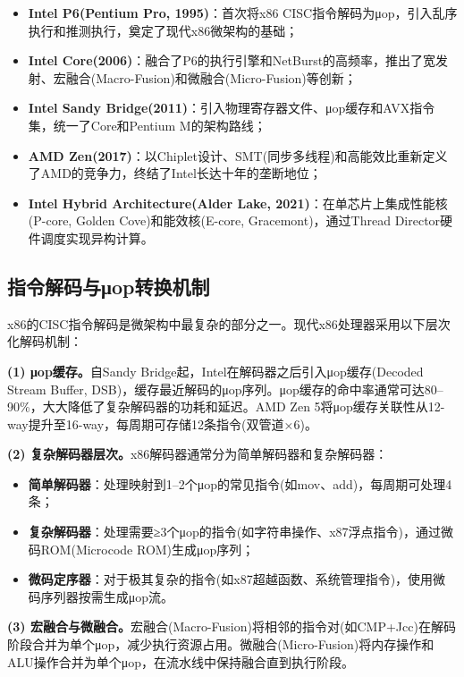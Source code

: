 \documentclass[12pt,a4paper]{IEEEtran}
\begin{document}
\begin{itemize}
\item \textbf{Intel P6(Pentium Pro, 1995)}：首次将x86 CISC指令解码为μop，引入乱序执行和推测执行，奠定了现代x86微架构的基础；
\item \textbf{Intel Core(2006)}：融合了P6的执行引擎和NetBurst的高频率，推出了宽发射、宏融合(Macro-Fusion)和微融合(Micro-Fusion)等创新；
\item \textbf{Intel Sandy Bridge(2011)}：引入物理寄存器文件、μop缓存和AVX指令集，统一了Core和Pentium M的架构路线；
\item \textbf{AMD Zen(2017)}：以Chiplet设计、SMT(同步多线程)和高能效比重新定义了AMD的竞争力，终结了Intel长达十年的垄断地位\cite{cutress2017zen}；
\item \textbf{Intel Hybrid Architecture(Alder Lake, 2021)}：在单芯片上集成性能核(P-core, Golden Cove)和能效核(E-core, Gracemont)，通过Thread Director硬件调度实现异构计算\cite{intel2021alderlake}。
\end{itemize}

\subsection{指令解码与μop转换机制}

x86的CISC指令解码是微架构中最复杂的部分之一。现代x86处理器采用以下层次化解码机制：

\textbf{(1) μop缓存。}自Sandy Bridge起，Intel在解码器之后引入μop缓存(Decoded Stream Buffer, DSB)，缓存最近解码的μop序列。μop缓存的命中率通常可达80--90\%，大大降低了复杂解码器的功耗和延迟。AMD Zen 5将μop缓存关联性从12-way提升至16-way，每周期可存储12条指令(双管道×6)\cite{amd2024zen5}。

\textbf{(2) 复杂解码器层次。}x86解码器通常分为简单解码器和复杂解码器：
\begin{itemize}
\item \textbf{简单解码器}：处理映射到1--2个μop的常见指令(如mov、add)，每周期可处理4条；
\item \textbf{复杂解码器}：处理需要≥3个μop的指令(如字符串操作、x87浮点指令)，通过微码ROM(Microcode ROM)生成μop序列；
\item \textbf{微码定序器}：对于极其复杂的指令(如x87超越函数、系统管理指令)，使用微码序列器按需生成μop流。
\end{itemize}

\textbf{(3) 宏融合与微融合。}宏融合(Macro-Fusion)将相邻的指令对(如CMP+Jcc)在解码阶段合并为单个μop，减少执行资源占用。微融合(Micro-Fusion)将内存操作和ALU操作合并为单个μop，在流水线中保持融合直到执行阶段\cite{intel2023optimization}。
\end{document}
